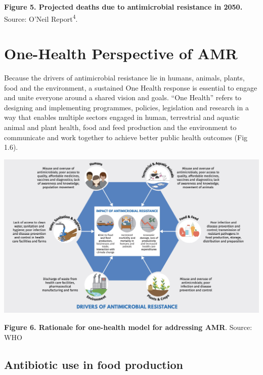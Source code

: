 \documentclass[
]{book}
\begin{document}
\textbf{Figure 5. Projected deaths due to antimicrobial resistance in 2050.} Source: O'Neil Report\textsuperscript{4}.

\hypertarget{one-health-perspective-of-amr}{%
\section*{One-Health Perspective of AMR}\label{one-health-perspective-of-amr}}

Because the drivers of antimicrobial resistance lie in humans, animals, plants, food and the environment, a sustained One Health response is essential to engage and unite everyone around a shared vision and goals. ``One Health'' refers to designing and implementing programmes, policies, legislation and research in a way that enables multiple sectors engaged in human, terrestrial and aquatic animal and plant health, food and feed production and the environment to communicate and work together to achieve better public health outcomes (Fig 1.6).

\includegraphics[width=8.33333in,height=\textheight]{images/onehealth.jpg}

\textbf{Figure 6. Rationale for one-health model for addressing AMR}. Source: WHO

\hypertarget{antibiotic-use-in-food-production}{%
\subsection*{Antibiotic use in food production}\label{antibiotic-use-in-food-production}}
\end{document}
